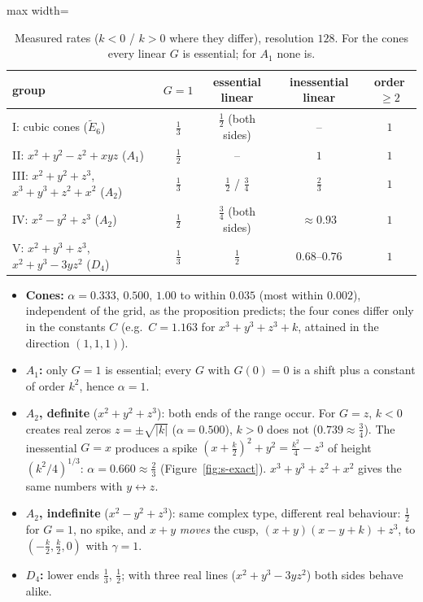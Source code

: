 \documentclass[11pt, a4paper]{article}
\theoremstyle{plain}
\theoremstyle{definition}
\theoremstyle{remark}
\theoremstyle{definition}
\begin{document}
\begin{table}[!h]
\centering
\small
\begin{adjustbox}{max width=\textwidth}
\begin{tabular}{l c c c c}
\toprule
group & $G=1$ & essential linear & inessential linear & order $\ge2$ \\
\midrule
I: cubic cones ($\tilde E_6$) & $\tfrac13$ & $\tfrac12$ (both sides) & -- & $1$ \\
II: $x^2+y^2-z^2+xyz$ ($A_1$) & $\tfrac12$ & -- & $1$ & $1$ \\
III: $x^2+y^2+z^3$, $x^3+y^3+z^2+x^2$ ($A_2$) & $\tfrac13$ & $\tfrac12$ / $\tfrac34$ & $\tfrac23$ & $1$ \\
IV: $x^2-y^2+z^3$ ($A_2$) & $\tfrac12$ & $\tfrac34$ (both sides) & $\approx0.93$ & $1$ \\
V: $x^2+y^3+z^3$, $x^2+y^3-3yz^2$ ($D_4$) & $\tfrac13$ & $\tfrac12$ & $0.68$--$0.76$ & $1$ \\
\bottomrule
\end{tabular}
\end{adjustbox}
\caption{Measured rates ($k<0$ / $k>0$ where they differ), resolution $128$. For the
cones every linear $G$ is essential; for $A_1$ none is.}
\label{tab:s-groups}
\end{table}

\begin{itemize}
    \item \textbf{Cones:} $\alpha=0.333$, $0.500$, $1.00$ to within $0.035$ (most within $0.002$),
          independent of the grid, as the proposition predicts; the four cones differ
          only in the constants $C$ (e.g.\ $C=1.163$ for $x^3+y^3+z^3+k$, attained
          in the direction $(1,1,1)$).
    \item \textbf{$A_1$:} only $G=1$ is essential; every $G$ with $G(0)=0$ is a shift
          plus a constant of order $k^2$, hence $\alpha=1$.
    \item \textbf{$A_2$, definite} ($x^2+y^2+z^3$): both ends of the range occur. For
          $G=z$, $k<0$ creates real zeros $z=\pm\sqrt{|k|}$ ($\alpha=0.500$), $k>0$ does
          not ($0.739\approx\tfrac34$). The inessential $G=x$ produces a spike
          $(x+\tfrac k2)^2+y^2=\tfrac{k^2}4-z^3$ of height $(k^2/4)^{1/3}$:
          $\alpha=0.660\approx\tfrac23$ (Figure~\ref{fig:s-exact}).
          $x^3+y^3+z^2+x^2$ gives the same numbers with $y\leftrightarrow z$.
    \item \textbf{$A_2$, indefinite} ($x^2-y^2+z^3$): same complex type, different real
          behaviour: $\tfrac12$ for $G=1$, no spike, and $x+y$ \emph{moves} the cusp,
          $(x+y)(x-y+k)+z^3$, to $(-\tfrac k2,\tfrac k2,0)$ with $\gamma=1$.
    \item \textbf{$D_4$:} lower ends $\tfrac13$, $\tfrac12$; with three real lines
          ($x^2+y^3-3yz^2$) both sides behave alike.
\end{itemize}
\end{document}

